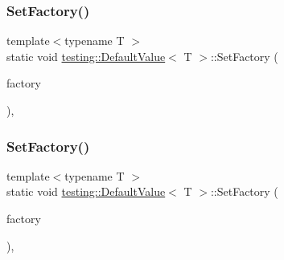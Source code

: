 \subsubsection{\texorpdfstring{SetFactory()}{SetFactory()}\hspace{0.1cm}{\footnotesize\ttfamily [1/3]}}
{\footnotesize\ttfamily template$<$typename T $>$ \\
static void \mbox{\hyperlink{classtesting_1_1_default_value}{testing\+::\+Default\+Value}}$<$ T $>$\+::Set\+Factory (\begin{DoxyParamCaption}\item[{\mbox{\hyperlink{classtesting_1_1_default_value_a5763a68d75e0a4c97fcaff708e2df803}{Factory\+Function}}}]{factory }\end{DoxyParamCaption})\hspace{0.3cm}{\ttfamily [inline]}, {\ttfamily [static]}}

\mbox{\label{classtesting_1_1_default_value_af012445ff5b194940c1427529707cb91}} 
\subsubsection{\texorpdfstring{SetFactory()}{SetFactory()}\hspace{0.1cm}{\footnotesize\ttfamily [2/3]}}
{\footnotesize\ttfamily template$<$typename T $>$ \\
static void \mbox{\hyperlink{classtesting_1_1_default_value}{testing\+::\+Default\+Value}}$<$ T $>$\+::Set\+Factory (\begin{DoxyParamCaption}\item[{\mbox{\hyperlink{classtesting_1_1_default_value_a5763a68d75e0a4c97fcaff708e2df803}{Factory\+Function}}}]{factory }\end{DoxyParamCaption})\hspace{0.3cm}{\ttfamily [inline]}, {\ttfamily [static]}}

\mbox{\label{classtesting_1_1_default_value_af012445ff5b194940c1427529707cb91}} 
